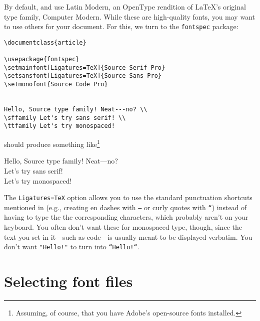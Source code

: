 By default, \LuaLaTeX{} and \XeLaTeX{} use Latin Modern,
an OpenType rendition of \LaTeX's original type family, Computer Modern.
While these are high-quality fonts,
you may want to use others for your document.
For this, we turn to the \texttt{fontspec} package:
\begin{leftfigure}
\begin{lstlisting}
\documentclass{article}

\usepackage{fontspec}
\setmainfont[Ligatures=TeX]{Source Serif Pro}
\setsansfont[Ligatures=TeX]{Source Sans Pro}
\setmonofont{Source Code Pro}


Hello, Source type family! Neat---no? \\
\sffamily Let's try sans serif! \\
\ttfamily Let's try monospaced!

\end{lstlisting}
\end{leftfigure}
should produce something like\footnote{Assuming, of course,
that you have Adobe's open-source fonts installed.\punckern{}}
\begin{leftfigure}
 Hello, Source type family! Neat---no? \\
 Let's try sans serif! \\
 Let's try monospaced!
\end{leftfigure}
The \verb|Ligatures=TeX| option allows you to use the standard punctuation
shortcuts mentioned in  (e.g., creating en dashes with
\texttt{--} or curly quotes with \texttt{``}) instead of having
to type the the corresponding characters, which probably aren't on your keyboard.
You often don't want these for monospaced type, though,
since the text you set in it---such as code---is usually meant to be displayed
verbatim. You don't want \verb|"Hello!"| to turn into
\verb|“Hello!“|.

\section{Selecting font files}

